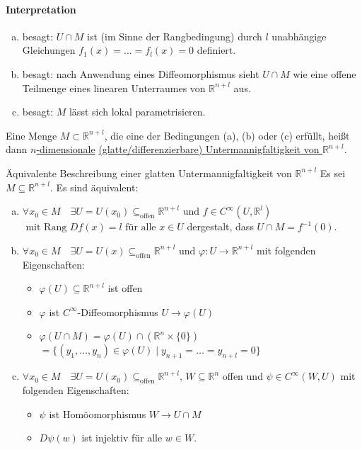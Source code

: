 \documentclass[a4paper,11pt,notitlepage]{report}
\theoremstyle{definition}
\newcommand{\R}{{\ensuremath{\mathbb{R}}}}
\newenvironment{definition}[1]{
	\begin{definitions}
	\marginnote{\emph{#1}}
}{\end{definitions}}
\begin{document}
\paragraph{Interpretation}
\begin{enumerate}[(a)]
	\item besagt: $U \cap M$ ist (im Sinne der Rangbedingung) durch $l$ unabhängige Gleichungen $f_1(x) = \ldots = f_l(x) = 0$ definiert.
	\item besagt: nach Anwendung eines Diffeomorphismus sieht $U \cap M$ wie eine offene Teilmenge eines linearen Unterraumes von $\R^{n+l}$ aus.
	\item besagt: $M$ lässt sich lokal parametrisieren.
\end{enumerate}

\begin{definition}{Untermannigfaltigkeit}
Eine Menge $M \subset \R^{n+l}$, die eine der Bedingungen (a), (b) oder (c) erfüllt, heißt dann \underline{$n$-dimensionale} \underline{(glatte/differenzierbare) Untermannigfaltigkeit von $\R^{n+l}$}.
\end{definition}


\begin{theorem}{Äquivalente Beschreibung einer glatten Untermannigfaltigkeit von $\R^{n+l}$}
	Es sei $M \subseteq \R^{n+l}$. Es sind äquivalent:
	\begin{enumerate}[(a)]
		\item $\forall x_0 \in M \quad \exists U = U(x_0) \subseteq_{\text{offen}} \R^{n+l} \text{ und } f \in C^\infty(U,\R^l)$ $\text{ mit Rang }Df(x) = l \text{ für alle } x \in U$ dergestalt, dass $U \cap M = f^{-1}(0)$.
		\item $\forall x_0 \in M \quad \exists U = U(x) \subseteq_{\text{offen}} \R^{n+l} \text{ und } \varphi \colon U \rightarrow \R^{n+l}$ mit folgenden Eigenschaften:
			\begin{itemize}
				\item $\varphi(U) \subseteq \R^{n+l}$ ist offen
				\item $\varphi$ ist $C^\infty$-Diffeomorphismus $U \rightarrow \varphi(U)$
				\item $\varphi(U \cap M) = \varphi(U) \cap (\R^n \times \{0\})$ $= \{(y_1, \ldots, y_n) \in \varphi(U) \mid y_{n+1} = \ldots = y_{n+l} = 0\}$
			\end{itemize}
		\item $\forall x_0 \in M \quad \exists U = U(x_0) \subseteq_{\text{offen}} \R^{n+l}$, $W \subseteq \R^n$ offen und $\psi \in C^\infty(W,U)$ mit folgenden Eigenschaften:
			\begin{itemize}
				\item $\psi$ ist Homöomorphismus $W \rightarrow U \cap M$
				\item $D\psi(w)$ ist injektiv für alle $w \in W$.
			\end{itemize}
	\end{enumerate}
\end{theorem}
\end{document}
